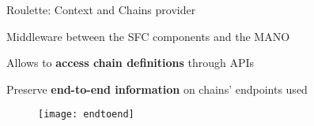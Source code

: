 \begin{frame}{Roulette: Context and Chains provider}

  Middleware between the SFC components and the MANO

  \vfill{}

  Allows to \textbf{access chain definitions} through APIs

  \vfill{}

  Preserve \textbf{end-to-end information} on chains' endpoints used

  \vfill{}

  \begin{figure}
    \centering
    \texttt{[image: endtoend]}
  \end{figure}

\end{frame}